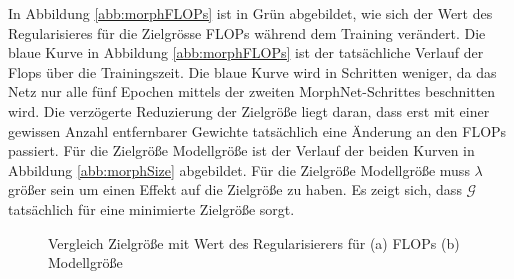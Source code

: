 In Abbildung \ref{abb:morphFLOPs} ist in Grün abgebildet, wie sich der Wert des Regularisieres für die Zielgrösse FLOPs während dem Training verändert. Die blaue Kurve in Abbildung \ref{abb:morphFLOPs} ist der tatsächliche Verlauf der Flops über die Trainingszeit. Die blaue Kurve wird in Schritten weniger, da das Netz nur alle fünf Epochen mittels der zweiten MorphNet-Schrittes beschnitten wird. Die verzögerte Reduzierung der Zielgröße liegt daran, dass erst mit einer gewissen Anzahl entfernbarer Gewichte tatsächlich eine Änderung an den FLOPs passiert. Für die Zielgröße Modellgröße ist der Verlauf der beiden Kurven in Abbildung \ref{abb:morphSize} abgebildet. Für die Zielgröße Modellgröße muss $\lambda$ größer sein um einen Effekt auf die Zielgröße zu haben. Es zeigt sich, dass $\mathcal{G}$ tatsächlich für eine minimierte Zielgröße sorgt.

\begin{figure}
     \centering
     \hfill
     \caption{Vergleich Zielgröße mit Wert des Regularisierers für (a) FLOPs (b) Modellgröße }
     \label{abb:morph1}
\end{figure}


